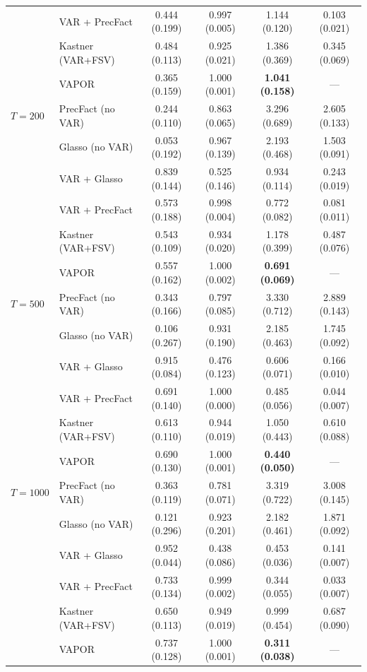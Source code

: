 \begin{table}[h!]
\begin{tabular}{llcccc}
           & VAR + PrecFact     & 0.444 (0.199) & 0.997 (0.005) & 1.144 (0.120) & 0.103 (0.021) \\
           & Kastner (VAR+FSV)  & 0.484 (0.113) & 0.925 (0.021) & 1.386 (0.369) & 0.345 (0.069) \\
           & VAPOR              & 0.365 (0.159) & 1.000 (0.001) & \textbf{1.041 (0.158)} & --- \\
\midrule
$T = 200$  & PrecFact (no VAR)  & 0.244 (0.110) & 0.863 (0.065) & 3.296 (0.689) & 2.605 (0.133) \\
           & Glasso (no VAR)    & 0.053 (0.192) & 0.967 (0.139) & 2.193 (0.468) & 1.503 (0.091) \\
           & VAR + Glasso       & 0.839 (0.144) & 0.525 (0.146) & 0.934 (0.114) & 0.243 (0.019) \\
           & VAR + PrecFact     & 0.573 (0.188) & 0.998 (0.004) & 0.772 (0.082) & 0.081 (0.011) \\
           & Kastner (VAR+FSV)  & 0.543 (0.109) & 0.934 (0.020) & 1.178 (0.399) & 0.487 (0.076) \\
           & VAPOR              & 0.557 (0.162) & 1.000 (0.002) & \textbf{0.691 (0.069)} & --- \\
\midrule
$T = 500$  & PrecFact (no VAR)  & 0.343 (0.166) & 0.797 (0.085) & 3.330 (0.712) & 2.889 (0.143) \\
           & Glasso (no VAR)    & 0.106 (0.267) & 0.931 (0.190) & 2.185 (0.463) & 1.745 (0.092) \\
           & VAR + Glasso       & 0.915 (0.084) & 0.476 (0.123) & 0.606 (0.071) & 0.166 (0.010) \\
           & VAR + PrecFact     & 0.691 (0.140) & 1.000 (0.000) & 0.485 (0.056) & 0.044 (0.007) \\
           & Kastner (VAR+FSV)  & 0.613 (0.110) & 0.944 (0.019) & 1.050 (0.443) & 0.610 (0.088) \\
           & VAPOR              & 0.690 (0.130) & 1.000 (0.001) & \textbf{0.440 (0.050)} & --- \\
\midrule
$T = 1000$ & PrecFact (no VAR)  & 0.363 (0.119) & 0.781 (0.071) & 3.319 (0.722) & 3.008 (0.145) \\
           & Glasso (no VAR)    & 0.121 (0.296) & 0.923 (0.201) & 2.182 (0.461) & 1.871 (0.092) \\
           & VAR + Glasso       & 0.952 (0.044) & 0.438 (0.086) & 0.453 (0.036) & 0.141 (0.007) \\
           & VAR + PrecFact     & 0.733 (0.134) & 0.999 (0.002) & 0.344 (0.055) & 0.033 (0.007) \\
           & Kastner (VAR+FSV)  & 0.650 (0.113) & 0.949 (0.019) & 0.999 (0.454) & 0.687 (0.090) \\
           & VAPOR              & 0.737 (0.128) & 1.000 (0.001) & \textbf{0.311 (0.038)} & --- \\
\bottomrule
\end{tabular}
\end{table}

